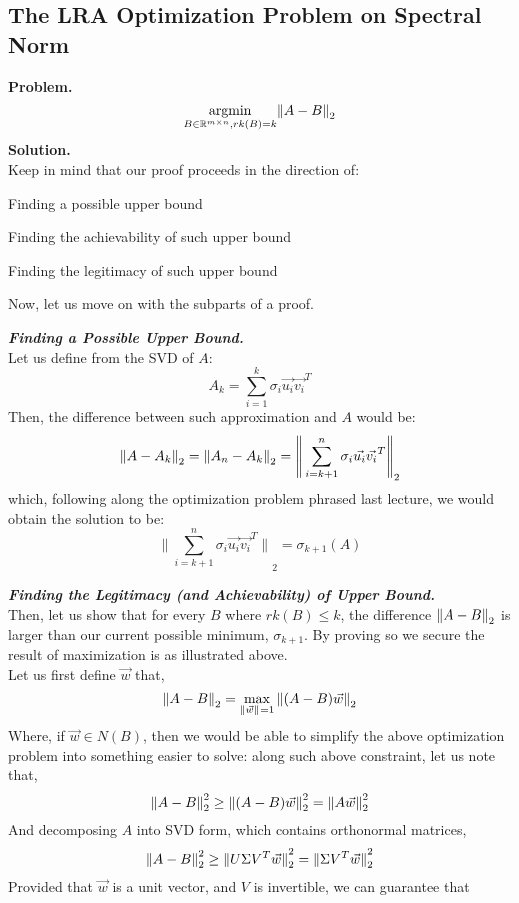 \subsection{The LRA Optimization Problem on Spectral Norm}
\textbf{Problem.}
\[
    \underset{B \in \R^{m \times n}, rk(B) = k}{\text{argmin}} \pnorm{A - B}{2}
\]
\textbf{Solution.} \\
Keep in mind that our proof proceeds in the direction of:
\begin{bindenum}
    \item Finding a possible upper bound
    \item Finding the achievability of such upper bound
    \item Finding the legitimacy of such upper bound
\end{bindenum}
Now, let us move on with the subparts of a proof. \\
\par
\textbf{\textit{Finding a Possible Upper Bound.}} \\
Let us define from the SVD of $A$:
\[
    A_k = \sum_{i = 1}^k \sigma_i \vec{u_i} \vec{v_i}^T
\]
Then, the difference between such approximation and $A$ would be:
\[\pnorm{A - A_k}{2} = \pnorm{A_n - A_k}{2} = {\Bigg\| \sum_{i = k + 1}^n \sigma_i \vec{u_i} \vec{v_i}^T \Bigg\|}_2\]
which, following along the optimization problem phrased last lecture, we would obtain the solution to be:
\[
    {\Bigg\| \sum_{i = k + 1}^n \sigma_i \vec{u_i} \vec{v_i}^T \Bigg\|}_2 = \sigma_{k + 1} (A)
\]
\par
\textbf{\textit{Finding the Legitimacy (and Achievability) of Upper Bound.}} \\
Then, let us show that for every $B$ where $rk(B) \leq k$, the difference $\pnorm{A - B}{2}$ is larger than our current possible minimum, $\sigma_{k + 1}$. By proving so we secure the result of maximization is as illustrated above. \\
Let us first define $\vec{w}$ that,
\[
    \pnorm{A - B}{2} = \max_{\pnorm{\vec{w}}{} = 1} \pnorm{(A - B) \vec{w}}{2}
\]
Where, if $\vec{w} \in N(B)$, then we would be able to simplify the above optimization problem into something easier to solve: along such above constraint, let us note that,
\[
    \pnorm[2]{A - B}{2} \geq \pnorm[2]{(A - B) \vec{w}}{2} = \pnorm[2]{A \vec{w}}{2}
\]
And decomposing $A$ into SVD form, which contains orthonormal matrices,
\[
    \pnorm[2]{A - B}{2} \geq \pnorm[2]{U \Sigma V^T \vec{w}}{2} = \pnorm[2]{\Sigma V^T \vec{w}}{2}
\]
Provided that $\vec{w}$ is a unit vector, and $V$ is invertible, we can guarantee that
